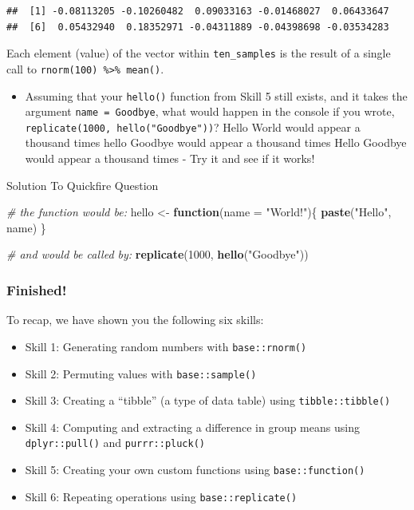 \documentclass[]{book}
\newenvironment{Shaded}{\begin{snugshade}}{\end{snugshade}}
\newcommand{\CommentTok}[1]{\textcolor[rgb]{0.56,0.35,0.01}{\textit{#1}}}
\newcommand{\ControlFlowTok}[1]{\textcolor[rgb]{0.13,0.29,0.53}{\textbf{#1}}}
\newcommand{\DataTypeTok}[1]{\textcolor[rgb]{0.13,0.29,0.53}{#1}}
\newcommand{\DecValTok}[1]{\textcolor[rgb]{0.00,0.00,0.81}{#1}}
\newcommand{\KeywordTok}[1]{\textcolor[rgb]{0.13,0.29,0.53}{\textbf{#1}}}
\newcommand{\NormalTok}[1]{#1}
\newcommand{\StringTok}[1]{\textcolor[rgb]{0.31,0.60,0.02}{#1}}
\providecommand{\tightlist}{%
  \setlength{\itemsep}{0pt}\setlength{\parskip}{0pt}}
\begin{document}
\begin{verbatim}
##  [1] -0.08113205 -0.10260482  0.09033163 -0.01468027  0.06433647
##  [6]  0.05432940  0.18352971 -0.04311889 -0.04398698 -0.03534283
\end{verbatim}

Each element (value) of the vector within \texttt{ten\_samples} is the result of a single call to \texttt{rnorm(100)\ \%\textgreater{}\%\ mean()}.

\begin{itemize}
\tightlist
\item
  Assuming that your \texttt{hello()} function from Skill 5 still exists, and it takes the argument \texttt{name\ =\ Goodbye}, what would happen in the console if you wrote, \texttt{replicate(1000,\ hello("Goodbye"))}? Hello World would appear a thousand times hello Goodbye would appear a thousand times Hello Goodbye would appear a thousand times - Try it and see if it works!
\end{itemize}

Solution To Quickfire Question

\begin{Shaded}
\begin{Highlighting}[]
\CommentTok{# the function would be:}
\NormalTok{hello <-}\StringTok{ }\ControlFlowTok{function}\NormalTok{(}\DataTypeTok{name =} \StringTok{"World!"}\NormalTok{)\{}
  \KeywordTok{paste}\NormalTok{(}\StringTok{"Hello"}\NormalTok{, name)}
\NormalTok{\}}

\CommentTok{# and would be called by:}
\KeywordTok{replicate}\NormalTok{(}\DecValTok{1000}\NormalTok{, }\KeywordTok{hello}\NormalTok{(}\StringTok{"Goodbye"}\NormalTok{))}
\end{Highlighting}
\end{Shaded}

\hypertarget{finished-11}{%
\subsubsection{Finished!}\label{finished-11}}

To recap, we have shown you the following six skills:

\begin{itemize}
\tightlist
\item
  Skill 1: Generating random numbers with \texttt{base::rnorm()}
\item
  Skill 2: Permuting values with \texttt{base::sample()}\\
\item
  Skill 3: Creating a ``tibble'' (a type of data table) using \texttt{tibble::tibble()}
\item
  Skill 4: Computing and extracting a difference in group means using \texttt{dplyr::pull()} and \texttt{purrr::pluck()}
\item
  Skill 5: Creating your own custom functions using \texttt{base::function()}
\item
  Skill 6: Repeating operations using \texttt{base::replicate()}
\end{itemize}
\end{document}

